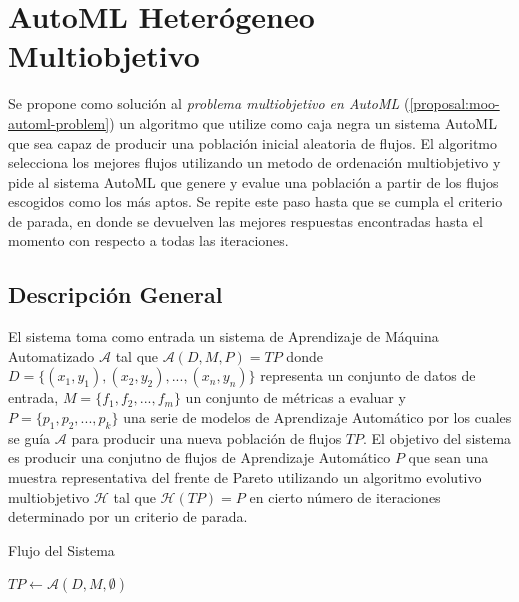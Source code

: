 
\chapter{AutoML Heter\'ogeneo Multiobjetivo}\label{chapter:proposal}

Se propone como soluci\'on al  \textit{problema multiobjetivo en AutoML} (\ref{proposal:moo-automl-problem}) un algoritmo que utilize como caja negra un sistema AutoML que sea capaz de producir una poblaci\'on inicial aleatoria de flujos. El algoritmo selecciona los mejores flujos utilizando un metodo de ordenaci\'on multiobjetivo y pide al sistema AutoML que genere y evalue una poblaci\'on a partir de los flujos escogidos como los m\'as aptos. 
Se repite este paso hasta que se cumpla el criterio de parada, en donde se devuelven las mejores respuestas encontradas hasta el momento con respecto a todas las iteraciones.

\section{Descripci\'on General}
El sistema toma como entrada un sistema de Aprendizaje de M\'aquina Automatizado $\mathcal{A}$ tal que $\mathcal{A}(D, M, P) = TP$ donde $D = \{(x_1, y_1), (x_2, y_2), ..., (x_n, y_n)\}$ representa un conjunto de datos de entrada, $M = \{f_1, f_2, ..., f_m\}$ un conjunto de m\'etricas a evaluar y $P = \{p_1, p_2, ..., p_k\}$ una serie de modelos de Aprendizaje Autom\'atico por los cuales se gu\'ia $\mathcal{A}$ para producir una nueva poblaci\'on de flujos $TP$. El objetivo del sistema es producir una conjutno de flujos de Aprendizaje Autom\'atico $P$ que sean una muestra representativa del frente de Pareto utilizando un algoritmo evolutivo multiobjetivo  $\mathcal{H}$ tal que $\mathcal{H}(TP) = P$ en cierto n\'umero de iteraciones determinado por un criterio de parada. 

\begin{algorithm}[H]\caption{Flujo del Sistema}
    
    $TP \gets \mathcal{A}(D, M, \emptyset)$ 
\end{algorithm}

